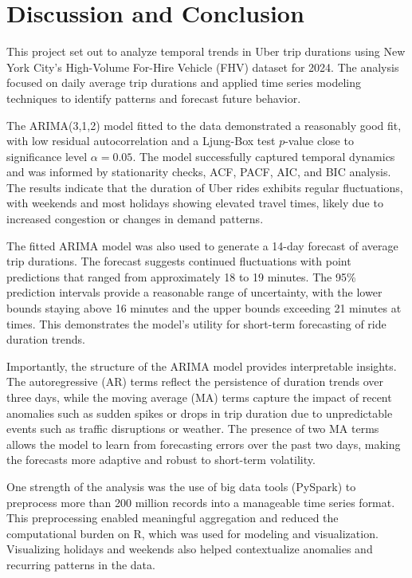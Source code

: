 \documentclass{article}
\begin{document}
\section{Discussion and Conclusion}

This project set out to analyze temporal trends in Uber trip durations using New York City's High-Volume For-Hire Vehicle (FHV) dataset for 2024. The analysis focused on daily average trip durations and applied time series modeling techniques to identify patterns and forecast future behavior.

The ARIMA(3,1,2) model fitted to the data demonstrated a reasonably good fit, with low residual autocorrelation and a Ljung-Box test $p$-value close to significance level $\alpha=0.05$. The model successfully captured temporal dynamics and was informed by stationarity checks, ACF, PACF, AIC, and BIC analysis. The results indicate that the duration of Uber rides exhibits regular fluctuations, with weekends and most holidays showing elevated travel times, likely due to increased congestion or changes in demand patterns.

The fitted ARIMA model was also used to generate a 14-day forecast of average trip durations. The forecast suggests continued fluctuations with point predictions that ranged from approximately 18 to 19 minutes. The 95\% prediction intervals provide a reasonable range of uncertainty, with the lower bounds staying above 16 minutes and the upper bounds exceeding 21 minutes at times. This demonstrates the model's utility for short-term forecasting of ride duration trends.

Importantly, the structure of the ARIMA model provides interpretable insights. The autoregressive (AR) terms reflect the persistence of duration trends over three days, while the moving average (MA) terms capture the impact of recent anomalies such as sudden spikes or drops in trip duration due to unpredictable events such as traffic disruptions or weather. The presence of two MA terms allows the model to learn from forecasting errors over the past two days, making the forecasts more adaptive and robust to short-term volatility.

One strength of the analysis was the use of big data tools (PySpark) to preprocess more than 200 million records into a manageable time series format. This preprocessing enabled meaningful aggregation and reduced the computational burden on R, which was used for modeling and visualization. Visualizing holidays and weekends also helped contextualize anomalies and recurring patterns in the data.
\end{document}
